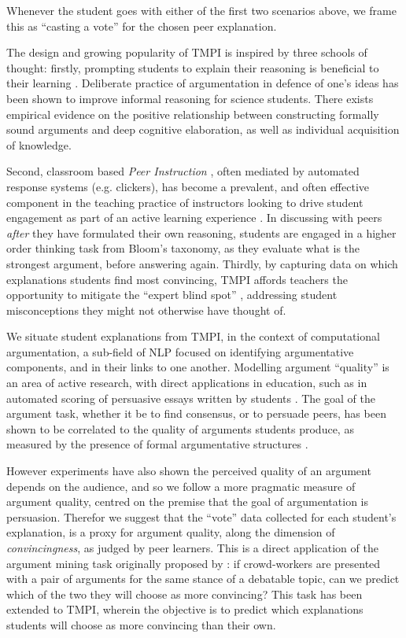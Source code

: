 \documentclass[notitlepage,12pt]{jedm}
\begin{document}
Whenever the student goes with either of the first two scenarios above, we 
frame this as ``casting a vote'' for the chosen peer explanation.

The design and growing popularity of TMPI is inspired by three schools of 
thought: firstly, prompting students to explain their reasoning is beneficial 
to their learning \cite{chi_eliciting_1994}. 
Deliberate practice of argumentation in defence of one's ideas has been shown 
to improve informal reasoning for science students\cite{venville_impact_2010}.
There exists empirical evidence on the positive relationship between 
constructing formally sound arguments and deep cognitive elaboration, as well 
as individual acquisition of knowledge\cite{stegmann_collaborative_2012}.
 
Second, classroom based \textit{Peer Instruction} \cite{crouch_peer_2001}, 
often mediated by automated response systems (e.g. clickers), has become a 
prevalent, and often effective component in the teaching practice of 
instructors looking to drive student engagement as part of an active learning 
experience \cite{charles_beyond_2015}. 
In discussing with peers \textit{after} they have formulated their own 
reasoning, students are engaged in a higher order thinking task from Bloom's 
taxonomy, as they evaluate what is the strongest argument, before answering 
again.
Thirdly, by capturing data on which explanations students find most convincing, 
TMPI affords teachers the opportunity to mitigate the ``expert blind spot'' 
\cite{nathan_expert_2001}, addressing student misconceptions they might not 
otherwise have thought of.

We situate student explanations from TMPI, in the context of computational 
argumentation, a sub-field of NLP focused on identifying argumentative 
components, and in their links to one another.
Modelling argument ``quality'' is an area of active research, with direct 
applications in education, such as in automated scoring of 
persuasive essays written by students \cite{persing_modeling_2015} 
\cite{nguyen_argument_2018}.
The goal of the argument task, whether it be to find 
consensus, or to persuade peers, has been shown to be correlated to the quality 
of arguments students produce, as measured by the presence of formal 
argumentative structures \cite{garcia-mila_effect_2013}.

However experiments have also shown the perceived quality of an argument 
depends on the audience, and so we follow a more 
pragmatic measure of argument quality, centred on the premise that the goal of
argumentation is persuasion\cite{mercier_why_2011}.
Therefor we suggest that the ``vote'' data collected for each student's 
explanation, is a proxy for argument quality, along the dimension of 
\textit{convincingness}, as judged by peer learners. 
This is a direct application of the argument mining task originally proposed by 
\cite{habernal_which_2016}: if crowd-workers are presented with a pair of 
arguments for the same stance of a debatable topic, can we predict which of the 
two they will choose as more convincing?
This task has been extended to TMPI, wherein the objective is to predict which 
explanations students will choose as more convincing than their 
own\cite{bhatnagar_learnersourcing_2020}.
\end{document}

